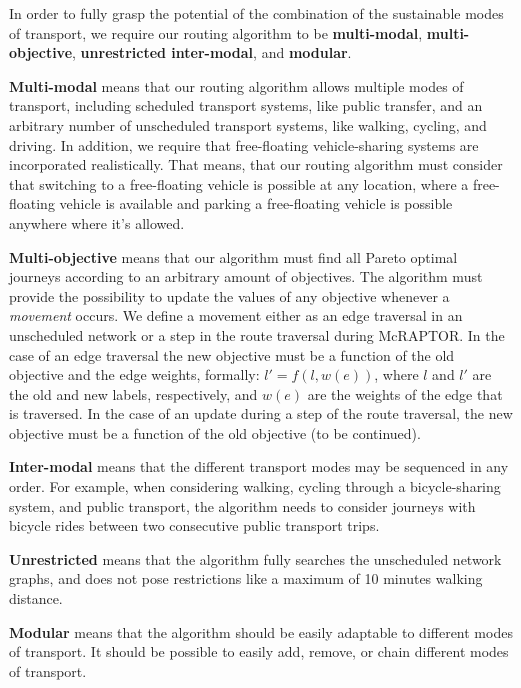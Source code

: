In order to fully grasp the potential of the combination of the sustainable modes of transport, we require our routing algorithm to be \textbf{multi-modal}, \textbf{multi-objective}, \textbf{unrestricted inter-modal}, and \textbf{modular}.

\textbf{Multi-modal} means that our routing algorithm allows multiple modes of transport, including scheduled transport systems, like public transfer, and an arbitrary number of unscheduled transport systems, like walking, cycling, and driving.
In addition, we require that free-floating vehicle-sharing systems are incorporated realistically.
That means, that our routing algorithm must consider that switching to a free-floating vehicle is possible at any location, where a free-floating vehicle is available and parking a free-floating vehicle is possible anywhere where it's allowed.

\textbf{Multi-objective} means that our algorithm must find all Pareto optimal journeys according to an arbitrary amount of objectives.
The algorithm must provide the possibility to update the values of any objective whenever a \textit{movement} occurs.
We define a movement either as an edge traversal in an unscheduled network or a step in the route traversal during McRAPTOR.
In the case of an edge traversal the new objective must be a function of the old objective and the edge weights, formally: \(l' = f(l, w(e))\), where \(l\) and \(l'\) are the old and new labels, respectively, and \(w(e)\) are the weights of the edge that is traversed.
In the case of an update during a step of the route traversal, the new objective must be a function of the old objective (to be continued).

\textbf{Inter-modal} means that the different transport modes may be sequenced in any order.
For example, when considering walking, cycling through a bicycle-sharing system, and public transport, the algorithm needs to consider journeys with bicycle rides between two consecutive public transport trips.

\textbf{Unrestricted} means that the algorithm fully searches the unscheduled network graphs, and does not pose restrictions like a maximum of 10 minutes walking distance.

\textbf{Modular} means that the algorithm should be easily adaptable to different modes of transport.
It should be possible to easily add, remove, or chain different modes of transport.


